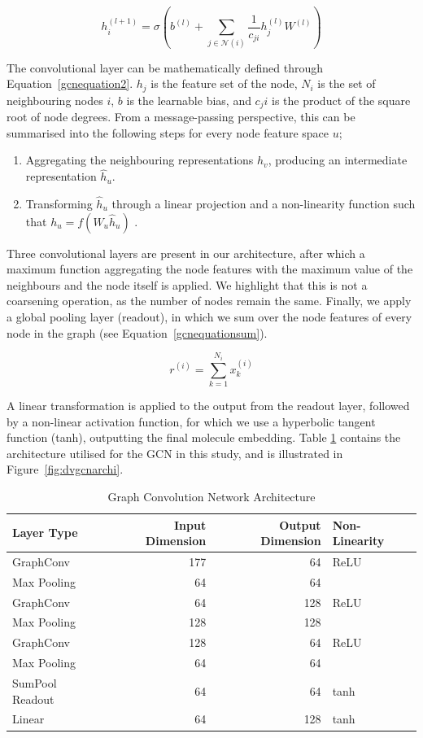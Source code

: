 \begin{equation}
	\label{gcnequation2}
	h_i^{(l+1)} = \sigma(b^{(l)} + \sum_{j\in\mathcal{N}(i)}\frac{1}{c_{ji}}h_j^{(l)}W^{(l)})
\end{equation}

The convolutional layer can be mathematically defined through Equation~\ref{gcnequation2}. $h_j$ is the feature set of the node, $N_i$ is the set of neighbouring nodes $i$, $b$ is the learnable bias, and $c_ji$ is the product of the square root of node degrees. From a message-passing perspective, this can be summarised into the following steps for every node feature space $u$;

\begin{enumerate}
	\item Aggregating the neighbouring representations $h_v$, producing an intermediate representation $\hat{h}_u$.
	\item Transforming $\hat{h}_u$ through a linear projection and a non-linearity function such that $h_u = f(W_u \hat{h}_u)$ \citep{kipf2016semi}.
\end{enumerate}

Three convolutional layers are present in our architecture, after which a maximum function aggregating the node features with the maximum value of the neighbours and the node itself is applied. We highlight that this is not a coarsening operation, as the number of nodes remain the same. Finally, we apply a global pooling layer (readout), in which we sum over the node features of every node in the graph (see Equation~\ref{gcnequationsum}). 

\begin{equation}
	\label{gcnequationsum}
	r^{(i)} = \sum_{k=1}^{N_i} x^{(i)}_k
\end{equation}

A linear transformation is applied to the output from the readout layer, followed by a non-linear activation function, for which we use a hyperbolic tangent function (tanh), outputting the final molecule embedding. Table \ref{table:gcn-architecture} contains the architecture utilised for the GCN in this study, and is illustrated in Figure~\ref{fig:dvgcnarchi}.

\begin{table}
	\centering
	\begin{tabular}{@{}lrrl@{}}
	\hline
	\textbf{Layer Type} & \textbf{Input Dimension} & \textbf{Output Dimension} & \textbf{Non-Linearity} \\
	\hline
	GraphConv & 177 & 64 & ReLU \\
	Max Pooling & 64 & 64 & \\
	GraphConv & 64 & 128 & ReLU \\
	Max Pooling & 128 & 128 & \\
	GraphConv & 128 & 64 & ReLU \\
	Max Pooling & 64 & 64 & \\
	SumPool Readout & 64 & 64 & tanh \\
	Linear & 64 & 128 & tanh \\
	\hline	
	\end{tabular}
	\caption{Graph Convolution Network Architecture}
	\label{table:gcn-architecture}
\end{table}

